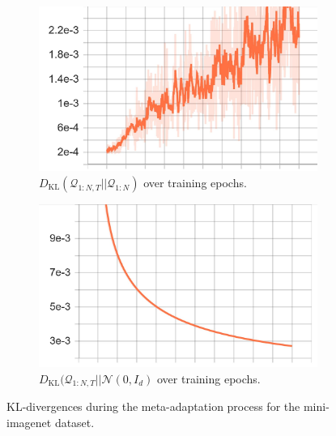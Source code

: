\documentclass{article} %
\theoremstyle{definition}
\begin{document}
\begin{figure}[h!]
	\centering
	\begin{subfigure}[b]{0.4\textwidth}
		\centering
		\includegraphics[width=\textwidth]{kl_adaptive}
		\caption{$D_{\mathrm{KL}}(\mathcal{Q}_{1:N,T}||\mathcal{Q}_{1:N})$ over training epochs.}
	\end{subfigure}
	\hfill
	\begin{subfigure}[b]{0.4\textwidth}
		\centering
		\includegraphics[width=\textwidth]{kl_normal}
		\caption{$D_{\mathrm{KL}}(\mathcal{Q}_{1:N,T}||\mathcal{N}(0,I_d)$ over training epochs.}	 	
	\end{subfigure}
	\hfill
	\caption{KL-divergences during the meta-adaptation process for the mini-imagenet dataset.}	 
	\label{fig:results-kls}
\end{figure}
\end{document}

